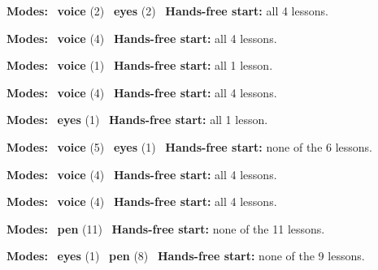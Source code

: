 \expandafter\def\csname hlchaptermodality6\endcsname{%
  {\small\noindent
    \textbf{Modes:} \hlvoicesign{}~\textbf{voice} (2) \quad \hlsightsign{}~\textbf{eyes} (2)\quad
    \hlvoicesign{}~\textbf{Hands-free start:} all 4 lessons.%
    \par}\medskip
}

\expandafter\def\csname hlchaptermodality7\endcsname{%
  {\small\noindent
    \textbf{Modes:} \hlvoicesign{}~\textbf{voice} (4)\quad
    \hlvoicesign{}~\textbf{Hands-free start:} all 4 lessons.%
    \par}\medskip
}

\expandafter\def\csname hlchaptermodality8\endcsname{%
  {\small\noindent
    \textbf{Modes:} \hlvoicesign{}~\textbf{voice} (1)\quad
    \hlvoicesign{}~\textbf{Hands-free start:} all 1 lesson.%
    \par}\medskip
}

\expandafter\def\csname hlchaptermodality9\endcsname{%
  {\small\noindent
    \textbf{Modes:} \hlvoicesign{}~\textbf{voice} (4)\quad
    \hlvoicesign{}~\textbf{Hands-free start:} all 4 lessons.%
    \par}\medskip
}

\expandafter\def\csname hlchaptermodality10\endcsname{%
  {\small\noindent
    \textbf{Modes:} \hlsightsign{}~\textbf{eyes} (1)\quad
    \hlvoicesign{}~\textbf{Hands-free start:} all 1 lesson.%
    \par}\medskip
}

\expandafter\def\csname hlchaptermodality11\endcsname{%
  {\small\noindent
    \textbf{Modes:} \hlvoicesign{}~\textbf{voice} (5) \quad \hlsightsign{}~\textbf{eyes} (1)\quad
    \hlvoicesign{}~\textbf{Hands-free start:} none of the 6 lessons.%
    \par}\medskip
}

\expandafter\def\csname hlchaptermodality12\endcsname{%
  {\small\noindent
    \textbf{Modes:} \hlvoicesign{}~\textbf{voice} (4)\quad
    \hlvoicesign{}~\textbf{Hands-free start:} all 4 lessons.%
    \par}\medskip
}

\expandafter\def\csname hlchaptermodality13\endcsname{%
  {\small\noindent
    \textbf{Modes:} \hlvoicesign{}~\textbf{voice} (4)\quad
    \hlvoicesign{}~\textbf{Hands-free start:} all 4 lessons.%
    \par}\medskip
}

\expandafter\def\csname hlchaptermodality14\endcsname{%
  {\small\noindent
    \textbf{Modes:} \hlpensign{}~\textbf{pen} (11)\quad
    \hlvoicesign{}~\textbf{Hands-free start:} none of the 11 lessons.%
    \par}\medskip
}

\expandafter\def\csname hlchaptermodality15\endcsname{%
  {\small\noindent
    \textbf{Modes:} \hlsightsign{}~\textbf{eyes} (1) \quad \hlpensign{}~\textbf{pen} (8)\quad
    \hlvoicesign{}~\textbf{Hands-free start:} none of the 9 lessons.%
    \par}\medskip
}
